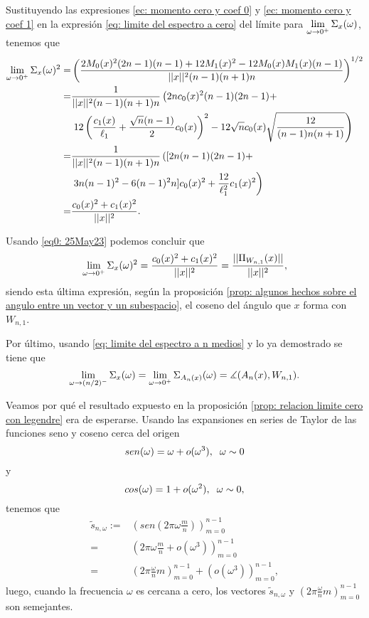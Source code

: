 Sustituyendo las expresiones 
\eqref{ec: momento cero y coef 0} y
\eqref{ec: momento cero y coef 1} en la expresión 
\eqref{eq: limite del espectro a cero} del límite para 
$\lim\limits_{\omega \rightarrow 0^{+}}{\Sigma_{x}(\omega)}$,
tenemos que
\begin{align*}
\lim\limits_{\omega \rightarrow 0^{+}}{\Sigma_{x}(\omega)^{2}}
= & 
\left(
\frac{
2M_{0}(x)^{2}(2n-1)(n-1) + 12M_{1}(x)^{2} - 12M_{0}(x)M_{1}(x)(n-1)
}{
||x||^{2} (n-1)(n+1)n}
\right)^{1/2} \\
= & \frac{1}{||x||^{2}
(n-1)(n+1)n
} 
\left(
2nc_{0}(x)^{2}(n-1)(2n-1) + \right. \\
& \left.
12
\left(
\frac{c_{1}(x)}{\ell_{1}} + 
\frac{\sqrt{n}(n-1)}{2}c_{0}(x)
\right)^{2}-12
\sqrt{n} c_{0}(x) \sqrt{\frac{12}{
(n-1)n(n+1)
}} 
\right) \\
= & \frac{1}{||x||^{2}
(n-1)(n+1)n}
\left(
[2n(n-1)(2n-1) + \right. \\
& \left.
3n(n-1)^{2}-6(n-1)^{2}n]c_{0}(x)^{2}
+ \frac{12}{\ell^{2}_{1}}c_{1}(x)^{2}
\right) \\
= & \frac{c_{0}(x)^{2} + c_{1}(x)^{2}}{||x||^{2}}.
\end{align*}

\noindent
Usando \eqref{eq0: 25May23} podemos concluir
que
\[
\lim\limits_{\omega \rightarrow 0^{+}}{\Sigma_{x}(\omega)^{2}}
=  \frac{c_{0}(x)^{2} + c_{1}(x)^{2}}{||x||^{2}}
=  \frac{||\Pi_{W_{n,1}}(x)||}{||x||^{2}},
\]
siendo esta última expresión, según la proposición
\ref{prop: algunos hechos sobre el angulo entre un vector y un subespacio}, 
el coseno del ángulo que $x$ forma con $W_{n,1}$.  

Por último, usando
\eqref{eq: limite del espectro a n medios}
y lo ya demostrado se tiene que
$$\lim\limits_{\omega \rightarrow (n/2)^{-}}{\Sigma_{x}(\omega)}
= \lim\limits_{\omega \rightarrow 0^{+}}{\Sigma_{A_{n}(x)}(\omega)}
= \measuredangle(A_{n}(x), W_{n,1}).$$
\QEDB
\vspace{0.2cm}



Veamos por qué el resultado expuesto en la proposición
\ref{prop: relacion limite cero con legendre}
era de esperarse. Usando las expansiones
en series de Taylor de las funciones seno y coseno
cerca del origen
\[
sen(\omega) = \omega + o(\omega^{3}), \hspace{0.2cm}
\omega \sim 0
\]
y
\[
cos(\omega) = 1 + o(\omega^{2}), \hspace{0.2cm}
\omega \sim 0,
\]
tenemos que
\begin{align*}
\tilde{s}_{n, \omega} := & \left(sen\left(2 \pi \omega \frac{m}{n} \right)\right)_{m=0}^{n-1}\\
= & \left( 2 \pi \omega \frac{m}{n} + o(\omega^{3}) \right)_{m=0}^{n-1} \\
= & \left( 2 \pi \frac{\omega}{n} m \right)_{m=0}^{n-1} + 
\left( o(\omega^{3}) \right)_{m=0}^{n-1},
\end{align*}
luego, cuando la frecuencia $\omega$ es cercana a cero, 
los vectores 
$\tilde{s}_{n, \omega}$ y $\left( 2 \pi \frac{\omega}{n} m \right)_{m=0}^{n-1} $
son semejantes.

